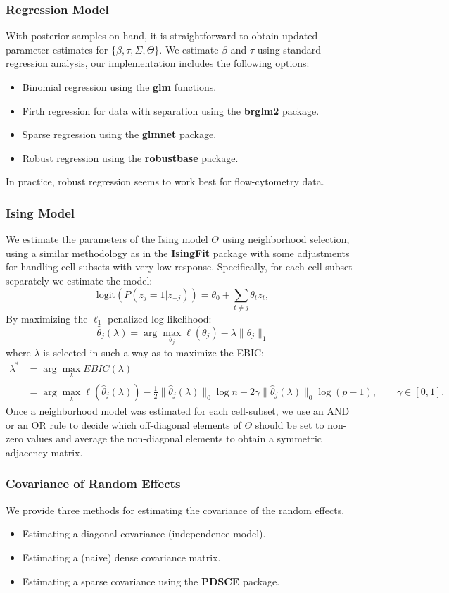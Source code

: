 \documentclass{article}
\begin{document}
\subsubsection{Regression Model}
With posterior samples on hand, it is straightforward to obtain updated parameter estimates for $\{\beta, \tau, \Sigma, \Theta\}$. We estimate $\beta$ and $\tau$ using standard regression analysis, our implementation includes the following options:
\begin{itemize}
\item Binomial regression using the \textbf{glm} functions.
\item Firth regression for data with separation using the \textbf{brglm2} package.
\item Sparse regression using the \textbf{glmnet} package. 
\item Robust regression using the \textbf{robustbase} package.
\end{itemize}
In practice, robust regression seems to work best for flow-cytometry data. 

\subsubsection{Ising Model}
We estimate the parameters of the Ising model $\Theta$ using neighborhood selection, using  a similar methodology as in the \textbf{IsingFit} package with some adjustments for handling cell-subsets with very low response. Specifically, for each cell-subset separately we estimate the model:
$$
\text{logit}(P(z_j = 1 |z_{-j}))= 
\theta_0 + \sum_{t \neq j} \theta_t z_t,
$$
By maximizing the $\ell_1$ penalized log-likelihood:
$$
\hat\theta_j(\lambda) = \arg\max_{\theta_j} \ell(\theta_j)  - 
\lambda \|\theta_j\|_1
$$
where $\lambda$ is selected in such a way as to maximize the EBIC:
\begin{align*}
\lambda^* &= \arg\max_\lambda EBIC(\lambda) \\
&=\arg\max_\lambda \ell(\hat\theta_j(\lambda)) - 
\frac{1}{2}\|\hat\theta_j(\lambda)\|_0 \log n -
2\gamma \|\hat\theta_j(\lambda)\|_0\log (p - 1), \qquad \gamma \in [0,1].
\end{align*}
Once a neighborhood model was estimated for each cell-subset, we use an AND or an OR rule to decide which off-diagonal elements of $\Theta$ should be set to non-zero values and average the non-diagonal elements to obtain a symmetric adjacency matrix. 

\subsubsection{Covariance of Random Effects} 
We provide three methods for estimating the covariance of the random effects. 
\begin{itemize}
\item Estimating a diagonal covariance (independence model).
\item Estimating a (naive) dense covariance matrix.
\item Estimating a sparse covariance using the \textbf{PDSCE} package. 
\end{itemize}
\end{document}
